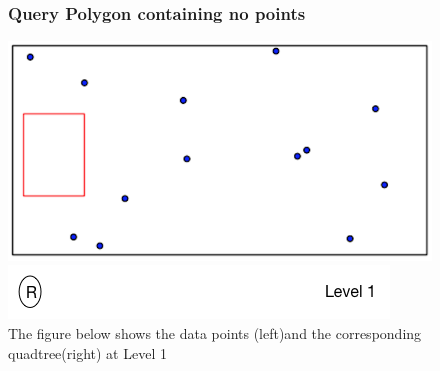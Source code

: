 \documentclass{article}
\begin{document}
\vspace{2cm}

\begin{figure}[H]
\subsubsection{Query Polygon containing no points}
\vspace{1cm}

  \centering
  \begin{minipage}[b]{0.35\textwidth}
    \includegraphics[width=\textwidth]{NoPointQuad1}  
  \end{minipage}
  \hfill
  \begin{minipage}[b]{0.6\textwidth}
    \includegraphics[width=\textwidth]{1_1Quad_1_tree}
  \end{minipage}
  \caption{The figure below shows the data points (left)and the corresponding quadtree(right) at Level 1}
\end{figure}

\vspace{2cm}
\end{document}
